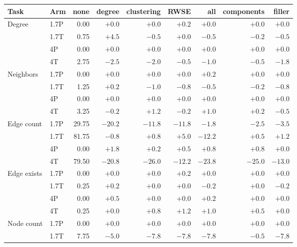 \begin{table}[t]
\centering\scriptsize
\setlength{\tabcolsep}{3.4pt}
\begin{tabular}{llrrrrrrr}
\toprule
Task & Arm & none & degree & clustering & RWSE & all & components & filler\\
\midrule
Degree & 1.7P & 0.00 & $+0.0$ & $+0.0$ & $+0.2$ & $+0.0$ & $+0.0$ & $+0.0$\\ %
 & 1.7T & 0.75 & $+4.5$ & $-0.5$ & $+0.0$ & $-0.5$ & $-0.2$ & $-0.5$\\ %
 & 4P & 0.00 & $+0.0$ & $+0.0$ & $+0.0$ & $+0.0$ & $+0.0$ & $+0.0$\\ %
 & 4T & 2.75 & $-2.5$ & $-2.0$ & $-0.5$ & $-1.0$ & $-0.5$ & $-1.8$\\ %
\addlinespace[2pt]
Neighbors & 1.7P & 0.00 & $+0.0$ & $+0.0$ & $+0.0$ & $+0.2$ & $+0.0$ & $+0.0$\\ %
 & 1.7T & 1.25 & $+0.2$ & $-1.0$ & $-0.8$ & $-0.5$ & $-0.2$ & $-0.8$\\ %
 & 4P & 0.00 & $+0.0$ & $+0.0$ & $+0.0$ & $+0.0$ & $+0.0$ & $+0.0$\\ %
 & 4T & 3.25 & $-0.2$ & $+1.2$ & $-0.2$ & $+1.0$ & $+0.2$ & $-0.5$\\ %
\addlinespace[2pt]
Edge count & 1.7P & 29.75 & $-20.2$ & $-11.8$ & $-11.8$ & $-1.8$ & $-2.5$ & $-3.5$\\ %
 & 1.7T & 81.75 & $-0.8$ & $+0.8$ & $+5.0$ & $-12.2$ & $+0.5$ & $+1.2$\\ %
 & 4P & 0.00 & $+1.8$ & $+0.2$ & $+0.5$ & $+0.8$ & $+0.8$ & $+0.0$\\ %
 & 4T & 79.50 & $-20.8$ & $-26.0$ & $-12.2$ & $-23.8$ & $-25.0$ & $-13.0$\\ %
\addlinespace[2pt]
Edge exists & 1.7P & 0.00 & $+0.0$ & $+0.0$ & $+0.2$ & $+0.0$ & $+0.0$ & $+0.0$\\ %
 & 1.7T & 0.25 & $+0.2$ & $+0.0$ & $+0.0$ & $-0.2$ & $+0.0$ & $-0.2$\\ %
 & 4P & 0.00 & $+0.5$ & $+0.0$ & $+0.0$ & $+0.2$ & $+0.0$ & $+0.0$\\ %
 & 4T & 0.25 & $+0.0$ & $+0.8$ & $+1.2$ & $+1.0$ & $+0.5$ & $+0.0$\\ %
\midrule
Node count & 1.7P & 0.00 & $+0.0$ & $+0.0$ & $+0.0$ & $+0.0$ & $+0.0$ & $+0.0$\\ %
 & 1.7T & 7.75 & $-5.0$ & $-7.8$ & $-7.8$ & $-7.8$ & $-0.5$ & $-7.8$\\ %

\end{tabular}
\end{table}
